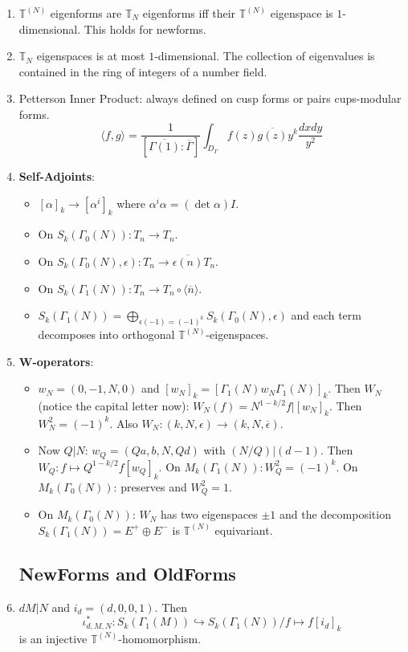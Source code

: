 \documentclass{article}
\newcommand{\ra}{\rightarrow}
\newcommand{\hra}{\hookrightarrow}
\begin{document}
\begin{multicols}{2}
\begin{enumerate}
\item $\mathbb{T}^{(N)}$ eigenforms are $\mathbb{T}_N$ eigenforms iff their $\mathbb{T}^{(N)}$ eigenspace is $1$-dimensional. This holds for newforms.

\item $\mathbb{T}_N$ eigenspaces is at most $1$-dimensional. The collection of eigenvalues is contained in the ring of integers of a number field. 

\item Petterson Inner Product: always defined on cusp forms or pairs cups-modular forms. 
\[\langle f,g \rangle = \frac{1}{[\overline{\Gamma(1)}: \overline{\Gamma}]} \int_{D_\Gamma} f(z) \overline{g(z)} y^k \frac{dxdy}{y^2}\]

\item \textbf{Self-Adjoints}:
\begin{itemize}
\item $[\alpha]_k \ra [\alpha^i]_k$ where $\alpha^i\alpha = (\det\alpha)I$.
\item On $S_k(\Gamma_0(N)): T_n \ra T_n$.
\item On $S_k(\Gamma_0(N),\epsilon): T_n \ra \overline{\epsilon(n)}T_n$. 
\item On $S_k(\Gamma_1(N)): T_n \ra T_n \circ \langle \overline{n}\rangle$.
\item $S_k(\Gamma_1(N)) = \bigoplus_{\epsilon(-1) = (-1)^k} S_k(\Gamma_0(N),\epsilon)$ and each term decomposes into orthogonal $\mathbb{T}^{(N)}$-eigenspaces.
\end{itemize}

\item \textbf{W-operators}: 
\begin{itemize}
\item $w_N = (0,-1,N,0)$ and $[w_N]_k = [\Gamma_1(N) w_N \Gamma_1(N)]_k$. Then $W_N$ (notice the capital letter now): $W_N(f) = N^{1-k/2}f|[w_N]_k$. Then $W_N^2 = (-1)^k$. Also $W_N: (k,N,\epsilon) \ra (k,N,\overline{\epsilon})$. 

\item Now $Q|N$: $w_Q = (Qa,b,N,Qd)$ with $(N/Q)|(d-1)$. Then $W_Q: f \mapsto Q^{1-k/2}f[w_Q]_k$. On $M_k(\Gamma_1(N)): W_Q^2 = (-1)^k$. On  $M_k(\Gamma_0(N))$: preserves and $W_Q^2 = 1$. 
\item On $M_k(\Gamma_0(N))$: $W_N$ has two eigenspaces $\pm 1$ and the decomposition $S_k(\Gamma_1(N)) = E^+ \oplus E^-$ is $\mathbb{T}^{(N)}$ equivariant.  
\end{itemize}
\subsection*{NewForms and OldForms}
\item $dM|N$ and $i_d = (d,0,0,1)$. Then 
\[\iota_{d,M,N}^*: S_k(\Gamma_1(M)) \hra S_k(\Gamma_1(N))/ f \mapsto f[i_d]_k\]
is an injective $\mathbb{T}^{(N)}$-homomorphism.


\end{enumerate}
\end{multicols}
\end{document}
